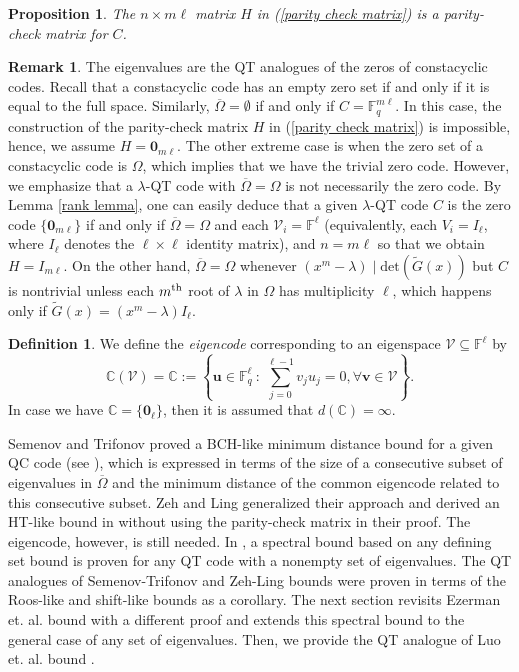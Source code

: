 \documentclass[11pt]{amsart}
\theoremstyle{plain}
\newtheorem{prop}[thm]{Proposition}
\theoremstyle{definition}
\newtheorem{defn}[thm]{Definition}
\newtheorem{rem}[thm]{Remark}
\numberwithin{equation}{section}
\newcommand{\Fq}{\mathbb{F}_{q}}
\newcommand{\F}{{\mathbb F}}
\begin{document}
\begin{prop}
The $n\times m\ell$ matrix $H$ in (\ref{parity check matrix}) is a parity-check matrix for $C$.
\end{prop}

\begin{rem}\label{analogy rem}
The eigenvalues are the QT analogues of the zeros of constacyclic codes. Recall that a constacyclic code has an empty zero set if and only if it is equal to the full space. Similarly, $\overline{\Omega}=\emptyset$ if and only if $C=\Fq^{m\ell}$. In this case, the construction of the parity-check matrix $H$ in (\ref{parity check matrix}) is impossible, hence, we assume $H=\mathbf{0}_{m\ell}$. The other extreme case is when the zero set of a constacyclic code is $\Omega$, which implies that we have the trivial zero code. However, we emphasize that a $\lambda$-QT code with $\overline{\Omega}=\Omega$ is not necessarily the zero code. By Lemma \ref{rank lemma}, one can easily deduce that a given $\lambda$-QT code $C$ is the zero code $\{\mathbf{0}_{m\ell}\}$ if and only if $\overline{\Omega}=\Omega$ and each $\mathcal{V}_i=\F^{\ell}$ (equivalently, each $V_i=I_{\ell}$, where $I_{\ell}$ denotes the $\ell\times\ell$ identity matrix), and $n=m\ell$ so that we obtain $H=I_{m\ell}$. On the other hand, $\overline{\Omega}=\Omega$ whenever $(x^m-\lambda) \mid \mbox{det}(\widetilde{G}(x))$ but $C$ is nontrivial unless each $m^{\rm th}$ root of $\lambda$ in $\Omega$ has multiplicity $\ell$, which happens only if $\widetilde{G}(x)=(x^m-\lambda) I_{\ell}$.
\end{rem}

\begin{defn}\label{eigencode}
We define the {\it eigencode} corresponding to an eigenspace $\mathcal{V}\subseteq \F^\ell$ by
\[
\mathbb{C}(\mathcal{V})=\mathbb{C}:=\left\{\mathbf{u}\in \Fq^\ell\ : \ \sum_{j=0}^{\ell-1}{v_ju_j}=0, \forall \mathbf{v} \in \mathcal{V}\right\}.
\]
In case we have $\mathbb{C}=\{\mathbf{0}_{\ell}\}$, then it is assumed that $d(\mathbb{C})=\infty$.
\end{defn}

Semenov and Trifonov proved a BCH-like minimum distance bound for a given QC code (see \cite[Theorem 2]{ST}), which is expressed in terms of the size of a consecutive subset of eigenvalues in $\overline{\Omega}$ and the minimum distance of the common eigencode related to this consecutive subset. Zeh and Ling generalized their approach and derived an HT-like bound in \cite[Theorem 1]{LZ} without using the parity-check matrix in their proof. The eigencode, however, is still needed. In \cite{ELLOT}, a spectral bound based on any defining set bound is proven for any QT code with a nonempty set of eigenvalues. The QT analogues of Semenov-Trifonov and Zeh-Ling bounds were proven in terms of the Roos-like and shift-like bounds as a corollary. The next section revisits Ezerman et. al. bound with a different proof and extends this spectral bound to the general case of any set of eigenvalues. Then, we provide the QT analogue of Luo et. al. bound \cite{LELO}.
\end{document}
